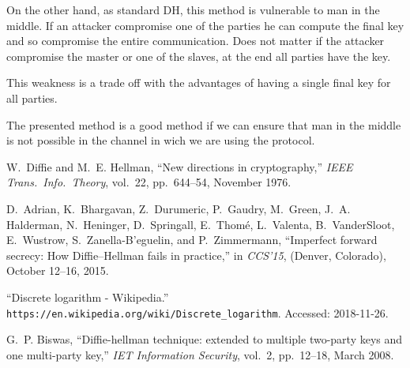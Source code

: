 \documentclass[11pt]{article}
\begin{document}
On the other hand, as standard DH, this method is vulnerable to man in the middle.
If an attacker compromise one of the parties he can compute the final key and so compromise the entire communication. 
Does not matter if the attacker compromise the master or one of the slaves, at the end all parties have the key.

This weakness is a trade off with the advantages of having a single final key for all parties.

The presented method is a good method if we can ensure that man in the middle is not possible in the channel in wich we are using the protocol. 

\vfill

\begin{thebibliography}{99}

W.~Diffie and M.~E. Hellman, ``New directions in cryptography,'' {\em IEEE
  Trans.\ Info.\ Theory}, vol.~22, pp.~644--54, November 1976.

D.~Adrian, K.~Bhargavan, Z.~Durumeric, P.~Gaudry, M.~Green, J.~A. Halderman,
  N.~Heninger, D.~Springall, E.~Thom\'{e}, L.~Valenta, B.~VanderSloot,
  E.~Wustrow, S.~Zanella-B'{e}guelin, and P.~Zimmermann, ``Imperfect forward
  secrecy: How {Diffie--Hellman} fails in practice,'' in {\em CCS'15}, (Denver,
  Colorado), October 12--16, 2015.

``{Discrete logarithm - Wikipedia}.'' \verb|https://en.wikipedia.org/wiki/Discrete_logarithm|.
\newblock Accessed: 2018-11-26.

G.~P. Biswas, ``Diffie-hellman technique: extended to multiple two-party keys
  and one multi-party key,'' {\em IET Information Security}, vol.~2,
  pp.~12--18, March 2008.


\end{thebibliography}
\end{document}

